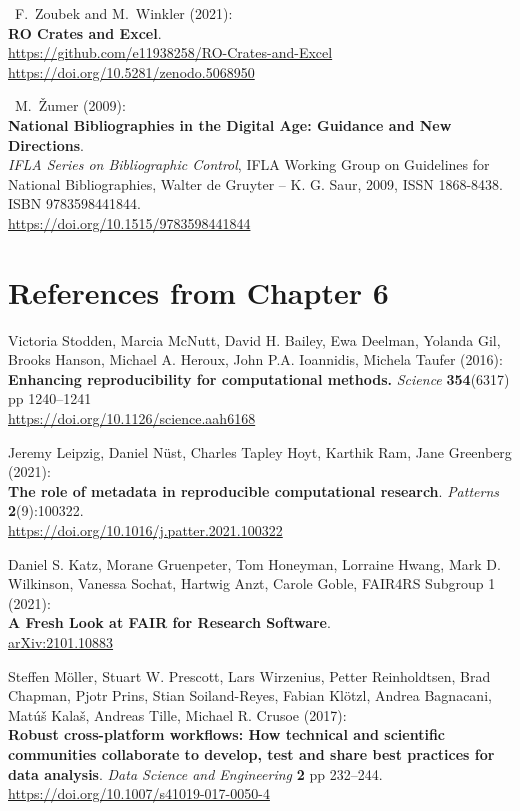 \begin{thebibliography}{9}
~F.~Zoubek and M.~Winkler (2021):\\
\textbf{RO Crates and Excel}.\\
\url{https://github.com/e11938258/RO-Crates-and-Excel}
\url{https://doi.org/10.5281/zenodo.5068950}

~M.~Žumer (2009):\\
\textbf{National Bibliographies in the Digital Age: Guidance and New
Directions}.\\
\emph{IFLA Series on Bibliographic Control}, IFLA Working Group on
Guidelines for National Bibliographies, Walter de Gruyter -- K. G. Saur,
2009, ISSN 1868-8438. ISBN 9783598441844.\\
\url{https://doi.org/10.1515/9783598441844}


\section{References from Chapter 6}

 Victoria Stodden, Marcia McNutt, David H. Bailey, Ewa Deelman,
Yolanda Gil, Brooks Hanson, Michael A. Heroux, John P.A. Ioannidis,
Michela Taufer (2016):\\
\textbf{Enhancing reproducibility for computational methods.}
\emph{Science} \textbf{354}(6317) pp 1240--1241\\
\url{https://doi.org/10.1126/science.aah6168}

 Jeremy Leipzig, Daniel Nüst, Charles Tapley Hoyt, Karthik Ram,
Jane Greenberg (2021):\\
\textbf{The role of metadata in reproducible computational research}.
\emph{Patterns} \textbf{2}(9):100322.\\
\url{https://doi.org/10.1016/j.patter.2021.100322}

 Daniel S. Katz, Morane Gruenpeter, Tom Honeyman, Lorraine Hwang,
Mark D. Wilkinson, Vanessa Sochat, Hartwig Anzt, Carole Goble, FAIR4RS
Subgroup 1 (2021):\\
\textbf{A Fresh Look at FAIR for Research Software}.\\
\href{https://arxiv.org/abs/2101.10883}{arXiv:2101.10883}

 Steffen Möller, Stuart W. Prescott, Lars Wirzenius, Petter
Reinholdtsen, Brad Chapman, Pjotr Prins, Stian Soiland-Reyes, Fabian
Klötzl, Andrea Bagnacani, Matúš Kalaš, Andreas Tille, Michael R. Crusoe
(2017):\\
\textbf{Robust cross-platform workflows: How technical and scientific
communities collaborate to develop, test and share best practices for
data analysis}. \emph{Data Science and Engineering} \textbf{2} pp
232--244.\\
\url{https://doi.org/10.1007/s41019-017-0050-4}


\end{thebibliography}
